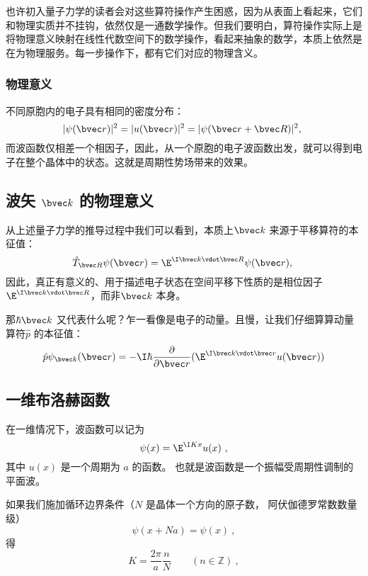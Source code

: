 也许初入量子力学的读者会对这些算符操作产生困惑，因为从表面上看起来，它们和物理实质并不挂钩，依然仅是一通数学操作。但我们要明白，算符操作实际上是将物理意义映射在线性代数空间下的数学操作，看起来抽象的数学，本质上依然是在为物理服务。每一步操作下，都有它们对应的物理含义。

\subsubsection{物理意义}
不同原胞内的电子具有相同的密度分布：
\begin{equation}
|\psi(\bvec r)|^2 = |u(\bvec r)|^2 = |\psi(\bvec r + \bvec R)|^2,~
\end{equation}
而波函数仅相差一个相因子，因此，从一个原胞的电子波函数出发，就可以得到电子在整个晶体中的状态。这就是周期性势场带来的效果。

\subsection{波矢 $\bvec k$ 的物理意义}
从上述量子力学的推导过程中我们可以看到，本质上$\bvec k$ 来源于平移算符的本征值：
\begin{equation}
\hat{T}_{\bvec R} \psi (\bvec r) = \E^{\I \bvec k \vdot  \bvec R}\psi (\bvec r),~
\end{equation}
因此，真正有意义的、用于描述电子状态在空间平移下性质的是相位因子$\E^{\I \bvec k \vdot  \bvec R}$，而非$\bvec k$ 本身。

那$\hbar \bvec k$ 又代表什么呢？乍一看像是电子的动量。且慢，让我们仔细算算动量算符$\hat{p}$ 的本征值：
\begin{equation}
\hat{p} \psi_{\bvec k} (\bvec r) = -\I \hbar \dfrac{\partial}{\partial \bvec r} (\E^{\I \bvec k \vdot \bvec r} u(\bvec r))
\end{equation}


\subsection{一维布洛赫函数}
在一维情况下，波函数可以记为
\begin{equation}
\psi(x) = \E^{\I K x} u(x)~,
\end{equation}
其中 $u(x)$ 是一个周期为 $a$ 的函数。 也就是波函数是一个振幅受周期性调制的平面波。

如果我们施加循环边界条件（$N$ 是晶体一个方向的原子数， 阿伏伽德罗常数数量级）
\begin{equation}
\psi(x+Na) = \psi(x)~,
\end{equation}
得
\begin{equation}
K = \frac{2\pi}{a} \frac{n}{N} \qquad (n \in \mathbb Z)~,
\end{equation}


